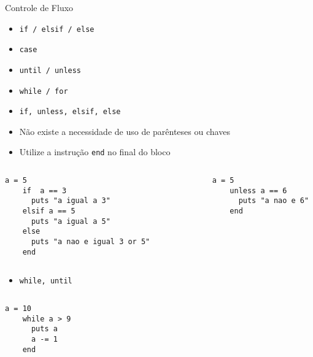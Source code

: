 
\begin{frame}{Controle de Fluxo}
  \begin{itemize}
    \item \verb!if / elsif / else!
    \item \verb!case!
    \item \verb!until / unless!
    \item \verb!while / for!
  \end{itemize}   
\pagebreak
  \begin{itemize}
    \item \verb!if, unless, elsif, else!
    \item Não existe a necessidade de uso de parênteses ou chaves
    \item Utilize a instrução \verb!end! no final do bloco
  \end{itemize}   
  \begin{columns}
    \begin{column}{0.5\textwidth}
      \begin{lstlisting}[style=RubyInputStyle]
    a = 5 
    if  a == 3                    
      puts "a igual a 3"                  
    elsif a == 5 
      puts "a igual a 5"                   
    else                              
      puts "a nao e igual 3 or 5"
    end 
      \end{lstlisting}  
    \end{column}
    \begin{column}{0.5\textwidth}  %
      \begin{lstlisting}[style=RubyInputStyle]
    a = 5 
    unless a == 6
      puts "a nao e 6"
    end 
      \end{lstlisting}
    \end{column}
  \end{columns}
\pagebreak
  \begin{itemize}
    \item \verb!while, until!
  \end{itemize}   
  \begin{columns}
    \begin{column}{0.5\textwidth}
      \begin{lstlisting}[style=RubyInputStyle]
    a = 10
    while a > 9
      puts a 
      a -= 1 
    end 
      \end{lstlisting}  
    \end{column}
    \begin{column}{0.5\textwidth}  %
      \begin{lstlisting}[style=RubyInputStyle]

\end{lstlisting}
\end{column}
\end{columns}
\end{frame}
